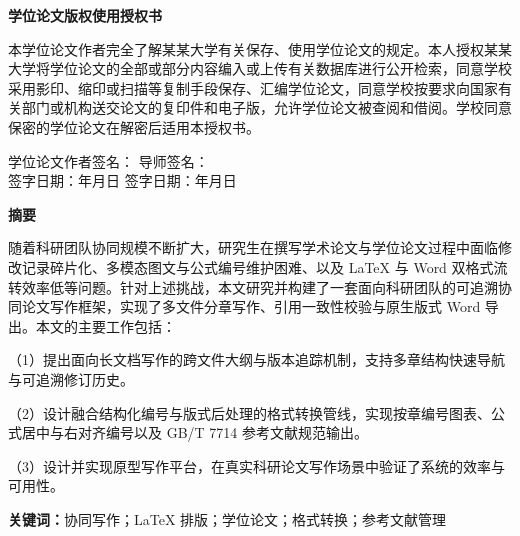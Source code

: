 \documentclass[a4paper,12pt,twoside,openany]{ctexbook}
\newcommand{\ThesisUniversity}{某某大学}
\begin{document}
\vspace{4.2em}
\begin{center}
  {\heiti\bfseries 学位论文版权使用授权书}
\end{center}
\vspace{0.6em}
本学位论文作者完全了解\ThesisUniversity 有关保存、使用学位论文的规定。本人授权\ThesisUniversity 将学位论文的全部或部分内容编入或上传有关数据库进行公开检索，同意学校采用影印、缩印或扫描等复制手段保存、汇编学位论文，同意学校按要求向国家有关部门或机构送交论文的复印件和电子版，允许学位论文被查阅和借阅。学校同意保密的学位论文在解密后适用本授权书。

\vspace{1.6em}
\noindent 学位论文作者签名：\hspace{4.2cm} 导师签名：\\[0.8em]
\noindent 签字日期：\hspace{1.0cm}年\hspace{0.7cm}月\hspace{0.7cm}日 \hspace{2.2cm}
签字日期：\hspace{1.0cm}年\hspace{0.7cm}月\hspace{0.7cm}日

\frontmatter
{}
\pagestyle{thesisfront}

\clearpage
{}
{}
\begin{center}
  {\heiti\bfseries 摘\quad 要}
\end{center}
\vspace{0.5em}
随着科研团队协同规模不断扩大，研究生在撰写学术论文与学位论文过程中面临修改记录碎片化、多模态图文与公式编号维护困难、以及 LaTeX 与 Word 双格式流转效率低等问题。针对上述挑战，本文研究并构建了一套面向科研团队的可追溯协同论文写作框架，实现了多文件分章写作、引用一致性校验与原生版式 Word 导出。本文的主要工作包括：

（1）提出面向长文档写作的跨文件大纲与版本追踪机制，支持多章结构快速导航与可追溯修订历史。

（2）设计融合结构化编号与版式后处理的格式转换管线，实现按章编号图表、公式居中与右对齐编号以及 GB/T 7714 参考文献规范输出。

（3）设计并实现原型写作平台，在真实科研论文写作场景中验证了系统的效率与可用性。

\vspace{1em}
\noindent\textbf{关键词：}协同写作；LaTeX 排版；学位论文；格式转换；参考文献管理
\end{document}
